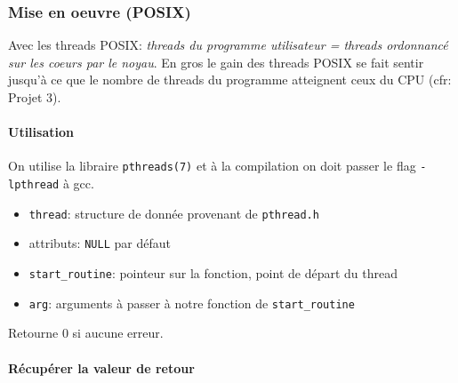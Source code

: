\subsubsection{Mise en oeuvre (POSIX)}\label{mise-en-oeuvre-posix}

Avec les threads POSIX: \emph{threads du programme utilisateur = threads
ordonnancé sur les coeurs par le noyau}. En gros le gain des threads
POSIX se fait sentir jusqu'à ce que le nombre de threads du programme
atteignent ceux du CPU (cfr: Projet 3).

\paragraph{Utilisation}\label{utilisation}

On utilise la libraire \texttt{pthreads(7)} et à la compilation on doit
passer le flag \texttt{-lpthread} à gcc.

\begin{Shaded}
\begin{Highlighting}[]

\OperatorTok{(}\OperatorTok{*}\OperatorTok{,}
                   \OperatorTok{*}\OperatorTok{,}
                    \OperatorTok{*(*}\OperatorTok{)(} \OperatorTok{*),}
                    \OperatorTok{*}\OperatorTok{);}
\end{Highlighting}
\end{Shaded}

\begin{itemize}
\tightlist
\item
  \texttt{thread}: structure de donnée provenant de \texttt{pthread.h}
\item
  attributs: \texttt{NULL} par défaut
\item
  \texttt{start\_routine}: pointeur sur la fonction, point de départ du
  thread
\item
  \texttt{arg}: arguments à passer à notre fonction de
  \texttt{start\_routine}
\end{itemize}

Retourne \(0\) si aucune erreur.

\paragraph{Récupérer la valeur de
retour}\label{ruxe9cupuxe9rer-la-valeur-de-retour}

